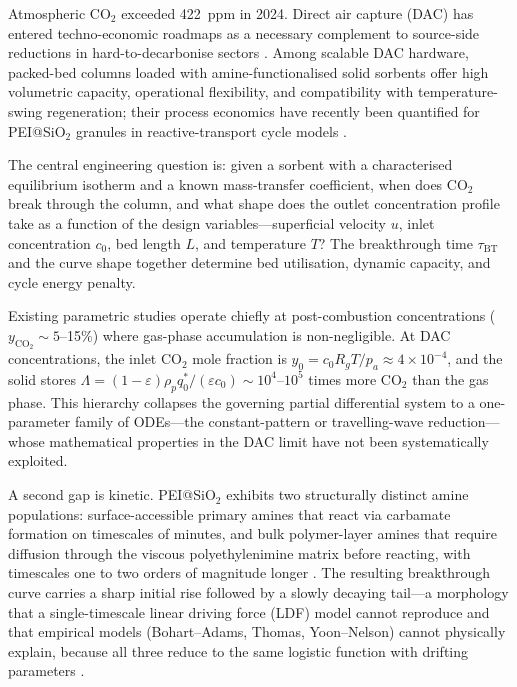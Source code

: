 \documentclass[a4paper]{amsart}
\theoremstyle{definition}
\begin{document}
Atmospheric CO$_2$ exceeded 422~ppm in 2024.  Direct air capture (DAC) has
entered techno-economic roadmaps as a necessary complement to source-side
reductions in hard-to-decarbonise sectors \cite{IEA2022,IPCC2023}.  Among
scalable DAC hardware, packed-bed columns loaded with amine-functionalised
solid sorbents offer high volumetric capacity, operational flexibility, and
compatibility with temperature-swing regeneration; their process economics have
recently been quantified for PEI@SiO$_2$ granules in reactive-transport cycle
models \cite{Pedrozo2025}.

The central engineering question is: given a sorbent with a characterised
equilibrium isotherm and a known mass-transfer coefficient, when does CO$_2$
break through the column, and what shape does the outlet concentration profile
take as a function of the design variables---superficial velocity $u$, inlet
concentration $c_0$, bed length $L$, and temperature $T$?  The breakthrough
time $\tau_\text{BT}$ and the curve shape together determine bed utilisation,
dynamic capacity, and cycle energy penalty.

Existing parametric studies operate chiefly at post-combustion concentrations
($y_{\mathrm{CO}_2}\sim5$--15\%) where gas-phase accumulation is non-negligible.
At DAC concentrations, the inlet CO$_2$ mole fraction is
$y_0 = c_0 R_g T/p_a \approx 4\times10^{-4}$, and the solid stores
$\Lambda = (1-\varepsilon)\rho_p q_0^*/(\varepsilon c_0)\sim10^{4}$--$10^{5}$
times more CO$_2$ than the gas phase.  This hierarchy collapses the governing
partial differential system to a one-parameter family of ODEs---the
constant-pattern or travelling-wave reduction---whose mathematical properties
in the DAC limit have not been systematically exploited.

A second gap is kinetic.  PEI@SiO$_2$ exhibits two structurally distinct amine
populations: surface-accessible primary amines that react via carbamate
formation on timescales of minutes, and bulk polymer-layer amines that require
diffusion through the viscous polyethylenimine matrix before reacting, with
timescales one to two orders of magnitude longer \cite{Bollini2012,%
Kalyanaraman2015,Ohs2018}.  The resulting breakthrough curve carries a sharp
initial rise followed by a slowly decaying tail---a morphology that a
single-timescale linear driving force (LDF) model cannot reproduce and that
empirical models (Bohart--Adams, Thomas, Yoon--Nelson) cannot physically
explain, because all three reduce to the same logistic function with drifting
parameters \cite{Hu2024}.
\end{document}
